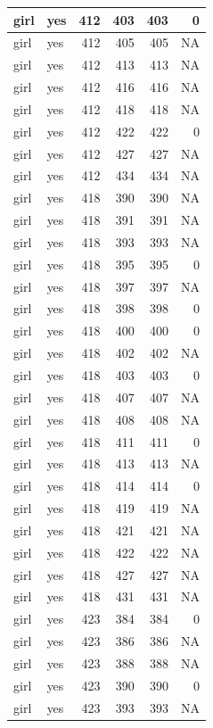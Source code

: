 \documentclass[man]{apa6}
\begin{document}
\begin{tabular}{l|l|r|r|r|r}
\hline
girl & yes & 412 & 403 & 403 & 0\\
\hline
girl & yes & 412 & 405 & 405 & NA\\
\hline
girl & yes & 412 & 413 & 413 & NA\\
\hline
girl & yes & 412 & 416 & 416 & NA\\
\hline
girl & yes & 412 & 418 & 418 & NA\\
\hline
girl & yes & 412 & 422 & 422 & 0\\
\hline
girl & yes & 412 & 427 & 427 & NA\\
\hline
girl & yes & 412 & 434 & 434 & NA\\
\hline
girl & yes & 418 & 390 & 390 & NA\\
\hline
girl & yes & 418 & 391 & 391 & NA\\
\hline
girl & yes & 418 & 393 & 393 & NA\\
\hline
girl & yes & 418 & 395 & 395 & 0\\
\hline
girl & yes & 418 & 397 & 397 & NA\\
\hline
girl & yes & 418 & 398 & 398 & 0\\
\hline
girl & yes & 418 & 400 & 400 & 0\\
\hline
girl & yes & 418 & 402 & 402 & NA\\
\hline
girl & yes & 418 & 403 & 403 & 0\\
\hline
girl & yes & 418 & 407 & 407 & NA\\
\hline
girl & yes & 418 & 408 & 408 & NA\\
\hline
girl & yes & 418 & 411 & 411 & 0\\
\hline
girl & yes & 418 & 413 & 413 & NA\\
\hline
girl & yes & 418 & 414 & 414 & 0\\
\hline
girl & yes & 418 & 419 & 419 & NA\\
\hline
girl & yes & 418 & 421 & 421 & NA\\
\hline
girl & yes & 418 & 422 & 422 & NA\\
\hline
girl & yes & 418 & 427 & 427 & NA\\
\hline
girl & yes & 418 & 431 & 431 & NA\\
\hline
girl & yes & 423 & 384 & 384 & 0\\
\hline
girl & yes & 423 & 386 & 386 & NA\\
\hline
girl & yes & 423 & 388 & 388 & NA\\
\hline
girl & yes & 423 & 390 & 390 & 0\\
\hline
girl & yes & 423 & 393 & 393 & NA\\

\end{tabular}
\end{document}
